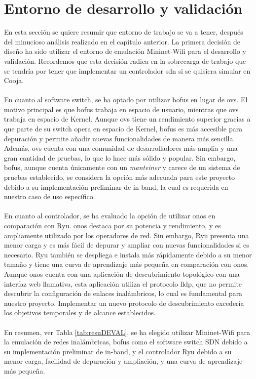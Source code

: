 \section{Entorno de desarrollo y validación}
\label{sec:scenarioDEV}

En esta sección se quiere resumir que entorno de trabajo se va a tener, después del minucioso análisis realizado en el capítulo anterior. La primera decisión de diseño ha sido utilizar el entorno de emulación Mininet-Wifi para el desarrollo y validación. Recordemos que esta decisión radica en la sobrecarga de trabajo que se tendría por tener que implementar un controlador \gls{sdn} si se quisiera simular en Cooja.\\
\\
En cuanto al software switch, se ha optado por utilizar \gls{bofus} en lugar de \gls{ovs}. El motivo principal es que \gls{bofus} trabaja en espacio de usuario, mientras que \gls{ovs} trabaja en espacio de Kernel. Aunque \gls{ovs} tiene un rendimiento superior gracias a que parte de su switch opera en espacio de Kernel, \gls{bofus} es más accesible para depuración y permite añadir nuevas funcionalidades de manera más sencilla. Además, \gls{ovs} cuenta con una comunidad de desarrolladores más amplia y una gran cantidad de pruebas, lo que lo hace más sólido y popular. Sin embargo, \gls{bofus}, aunque cuenta únicamente con un \textit{manteiner} y carece de un sistema de pruebas establecido, se considera la opción más adecuada para este proyecto debido a su implementación preliminar de in-band, la cual es requerida en nuestro caso de uso específico.\\
\\
En cuanto al controlador, se ha evaluado la opción de utilizar \gls{onos} en comparación con Ryu. \gls{onos} destaca por su potencia y rendimiento, y es ampliamente utilizado por los operadores de red. Sin embargo, Ryu presenta una menor carga y es más fácil de depurar y ampliar con nuevas funcionalidades si es necesario. Ryu también se despliega e instala más rápidamente debido a su menor tamaño y tiene una curva de aprendizaje más pequeña en comparación con \gls{onos}. Aunque \gls{onos} cuenta con una aplicación de descubrimiento topológico con una interfaz web llamativa, esta aplicación utiliza el protocolo \gls{lldp}, que no permite descubrir la configuración de enlaces inalámbricos, lo cual es fundamental para nuestro proyecto. Implementar un nuevo protocolo de descubrimiento excedería los objetivos temporales y de alcance establecidos.\\
\\
En resumen, ver Tabla \ref{tab:resuDEVAL}, se ha elegido utilizar Mininet-Wifi para la emulación de redes inalámbricas, \gls{bofus} como el software switch SDN debido a su implementación preliminar de in-band, y el controlador Ryu debido a su menor carga, facilidad de depuración y ampliación, y una curva de aprendizaje más pequeña.


